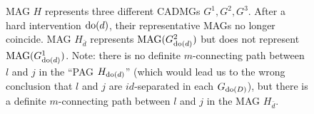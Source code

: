 \begin{figure}
  \caption{MAG $H$ represents three different CADMGs $G^1, G^2, G^3$.
    After a hard intervention $\operatorname{do}(d)$, their representative MAGs no longer coincide.
    MAG $H_{\bar d}$ represents $\mathrm{MAG}(G^2_{\operatorname{do}(d)})$ but does not represent $\mathrm{MAG}(G^1_{\operatorname{do}(d)})$.
    Note: there is no definite $m$-connecting path between $l$ and $j$ in the ``PAG $H_{\operatorname{do}(d)}$'' 
    (which would lead us to the wrong conclusion that $l$ and $j$ are $id$-separated in each $G_{\operatorname{do}(D)}$),
    but there is a definite $m$-connecting path between $l$ and $j$ in the MAG $H_{\bar d}$.
    \label{fig:mag_do}}
\end{figure}

